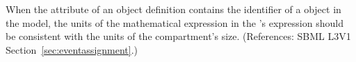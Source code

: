When the  attribute of an \EventAssignment object
definition contains the identifier of a \Compartment object in the model,
the units of the mathematical expression in the \EventAssignment's
 expression should be consistent with the units of the
compartment's size.  (References: SBML L3V1
Section~\ref{sec:eventassignment}.)
